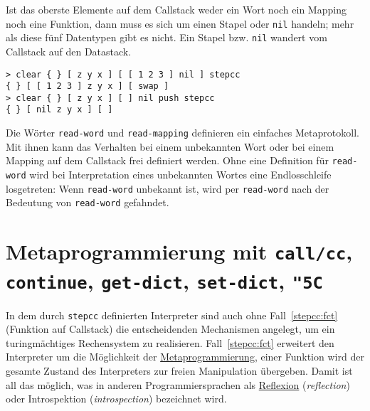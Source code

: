 Ist das oberste Elemente auf dem Callstack weder ein Wort noch ein Mapping noch eine Funktion, dann muss es sich um einen Stapel oder \verb|nil| handeln; mehr als diese fünf Datentypen gibt es nicht. Ein Stapel bzw. \verb|nil| wandert vom Callstack auf den Datastack.

\begin{verbatim}
> clear { } [ z y x ] [ [ 1 2 3 ] nil ] stepcc
{ } [ [ 1 2 3 ] z y x ] [ swap ]
> clear { } [ z y x ] [ ] nil push stepcc
{ } [ nil z y x ] [ ]
\end{verbatim}


Die Wörter \verb|read-word| und \verb|read-mapping| definieren ein einfaches Metaprotokoll. Mit ihnen kann das Verhalten bei einem unbekannten Wort oder bei einem Mapping auf dem Callstack frei definiert werden. Ohne eine Definition für \verb|read-word| wird bei Interpretation eines unbekannten Wortes eine Endlosschleife losgetreten: Wenn \verb|read-word| unbekannt ist, wird per \verb|read-word| nach der Bedeutung von \verb|read-word| gefahndet.

\section{Metaprogrammierung mit \texttt{call/cc}, \texttt{continue}, \texttt{get-dict}, \texttt{set-dict}, \texttt{{\char "5C}}}
\label{sec:core.meta}

In dem durch \verb|stepcc| definierten Interpreter sind auch ohne Fall~\ref{stepcc:fct} (Funktion auf Callstack) die entscheidenden Mechanismen angelegt, um ein turingmächtiges Rechensystem zu realisieren. Fall~\ref{stepcc:fct} erweitert den Interpreter um die Möglichkeit der \href{http://de.wikipedia.org/wiki/Metaprogrammierung}{Metaprogrammierung}, einer Funktion wird der gesamte Zustand des Interpreters zur freien Manipulation übergeben. Damit ist all das möglich, was in anderen Programmiersprachen als \href{http://de.wikipedia.org/wiki/Reflexion_(Programmierung)}{Reflexion} (\emph{reflection}) oder Introspektion (\emph{introspection}) bezeichnet wird.

